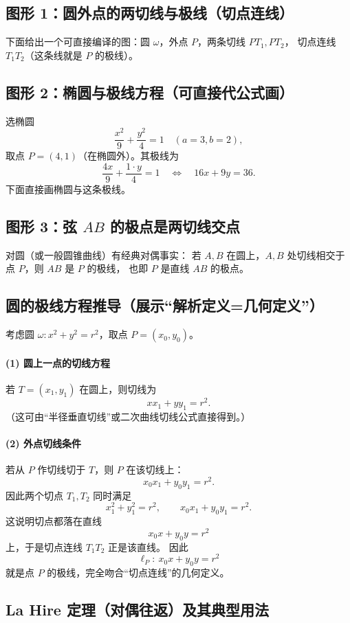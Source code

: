 \documentclass[UTF8]{ctexart}
\begin{document}
	\subsection{图形 1：圆外点的两切线与极线（切点连线）}
	下面给出一个可直接编译的图：圆 $\omega$，外点 $P$，两条切线 $PT_1,PT_2$，
	切点连线 $T_1T_2$（这条线就是 $P$ 的极线）。
	

	\subsection{图形 2：椭圆与极线方程（可直接代公式画）}
	选椭圆
	\[
	\frac{x^2}{9}+\frac{y^2}{4}=1\quad (a=3,b=2),
	\]
	取点 $P=(4,1)$（在椭圆外）。其极线为
	\[
	\frac{4x}{9}+\frac{1\cdot y}{4}=1\quad\Longleftrightarrow\quad 16x+9y=36.
	\]
	下面直接画椭圆与这条极线。
	

		\subsection{图形 3：弦 \texorpdfstring{$AB$}{AB} 的极点是两切线交点}
	对圆（或一般圆锥曲线）有经典对偶事实：
	若 $A,B$ 在圆上，$A,B$ 处切线相交于点 $P$，则 $AB$ 是 $P$ 的极线，
	也即 $P$ 是直线 $AB$ 的极点。
	

	
	\subsection{圆的极线方程推导（展示“解析定义=几何定义”）}
	考虑圆 $\omega: x^2+y^2=r^2$，取点 $P=(x_0,y_0)$。
	\paragraph{(1) 圆上一点的切线方程}
	若 $T=(x_1,y_1)$ 在圆上，则切线为
	\[
	x x_1 + y y_1 = r^2.
	\]
	（这可由“半径垂直切线”或二次曲线切线公式直接得到。）
	
	\paragraph{(2) 外点切线条件}
	若从 $P$ 作切线切于 $T$，则 $P$ 在该切线上：
	\[
	x_0 x_1 + y_0 y_1 = r^2.
	\]
	因此两个切点 $T_1,T_2$ 同时满足
	\[
	x_1^2+y_1^2=r^2,\qquad x_0x_1+y_0y_1=r^2.
	\]
	这说明切点都落在直线
	\[
	x_0x+y_0y=r^2
	\]
	上，于是切点连线 $T_1T_2$ 正是该直线。
	因此
	\[
	\ell_P:\ x_0x+y_0y=r^2
	\]
	就是点 $P$ 的极线，完全吻合“切点连线”的几何定义。
	
	\subsection{La Hire 定理（对偶往返）及其典型用法}
\end{document}
